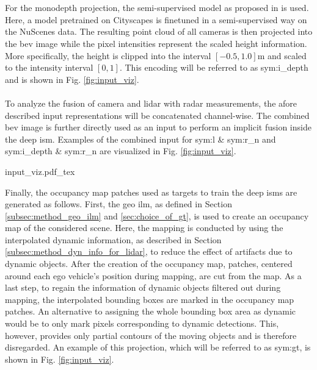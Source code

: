 \\\\
For the \gls{monodepth} projection, the semi-supervised model as proposed in \cite{guizilini2020robust} is used. Here, a model pretrained on Cityscapes is finetuned in a semi-supervised way on the NuScenes data. The resulting point cloud of all cameras is then projected into the \gls{bev} image while the pixel intensities represent the scaled height information. More specifically, the height is clipped into the interval $[-0.5,1.0]$m and scaled to the intensity interval $[0,1]$. This encoding will be referred to as \gls{sym:i_depth} and is shown in Fig. \ref{fig:input_viz}.
\\\\
To analyze the fusion of camera and lidar with radar measurements, the afore described input representations will be concatenated channel-wise. The combined \gls{bev} image is further directly used as an input to perform an implicit fusion inside the deep \gls{ism}. Examples of the combined input for \gls{sym:l} \& \gls{sym:r_n} and \gls{sym:i_depth} \& \gls{sym:r_n} are visualized in Fig. \ref{fig:input_viz}.
\begin{center}
	{input_viz.pdf_tex}
\end{center}
Finally, the occupancy map patches used as targets to train the deep \gls{ism}s are generated as follows. First, the geo \gls{ilm}, as defined in Section \ref{subsec:method_geo_ilm} and \ref{sec:choice_of_gt}, is used to create an occupancy map of the considered scene. Here, the mapping is conducted by using the interpolated dynamic information, as described in Section \ref{subsec:method_dyn_info_for_lidar}, to reduce the effect of artifacts due to dynamic objects. After the creation of the occupancy map, patches, centered around each ego vehicle's position during mapping, are cut from the map. As a last step, to regain the information of dynamic objects filtered out during mapping, the interpolated bounding boxes are marked in the occupancy map patches. An alternative to assigning the whole bounding box area as dynamic would be to only mark pixels corresponding to dynamic detections. This, however, provides only partial contours of the moving objects and is therefore disregarded. An example of this projection, which will be referred to as \gls{sym:gt}, is shown in Fig. \ref{fig:input_viz}.
%
